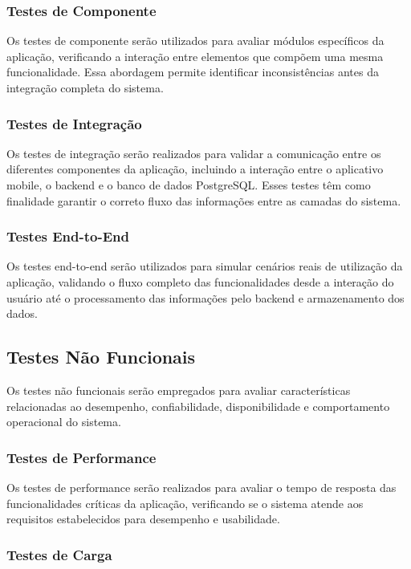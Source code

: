 \subsubsection{Testes de Componente}

Os testes de componente serão utilizados para avaliar módulos específicos da aplicação, verificando a interação entre elementos que compõem uma mesma funcionalidade. Essa abordagem permite identificar inconsistências antes da integração completa do sistema.

\subsubsection{Testes de Integração}

Os testes de integração serão realizados para validar a comunicação entre os diferentes componentes da aplicação, incluindo a interação entre o aplicativo mobile, o backend e o banco de dados PostgreSQL. Esses testes têm como finalidade garantir o correto fluxo das informações entre as camadas do sistema.

\subsubsection{Testes End-to-End}

Os testes end-to-end serão utilizados para simular cenários reais de utilização da aplicação, validando o fluxo completo das funcionalidades desde a interação do usuário até o processamento das informações pelo backend e armazenamento dos dados.

\subsection{Testes Não Funcionais}

Os testes não funcionais serão empregados para avaliar características relacionadas ao desempenho, confiabilidade, disponibilidade e comportamento operacional do sistema.

\subsubsection{Testes de Performance}

Os testes de performance serão realizados para avaliar o tempo de resposta das funcionalidades críticas da aplicação, verificando se o sistema atende aos requisitos estabelecidos para desempenho e usabilidade.

\subsubsection{Testes de Carga}

